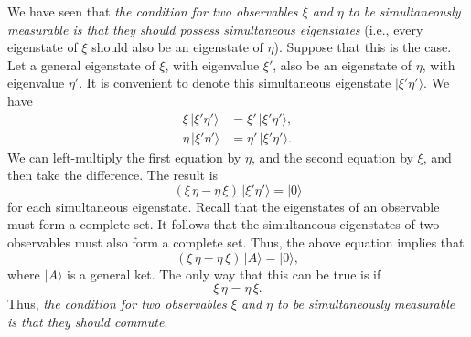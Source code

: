 We have seen that {\em the condition for two observables $\xi$ and $\eta$ to
be simultaneously measurable is that they should possess simultaneous
eigenstates} ({\rm i.e.}, every eigenstate of $\xi$ should also be an eigenstate
of $\eta$). Suppose that this is the case. Let a general eigenstate of
$\xi$,  with eigenvalue $\xi'$, also be an eigenstate of
$\eta$, with eigenvalue $\eta'$. It is convenient to denote this
simultaneous eigenstate $|\xi' \eta'\rangle$. We have
\begin{align}
\xi\,|\xi' \eta'\rangle &= \xi' \,|\xi' \eta'\rangle,\\[0.5ex]
\eta\,|\xi' \eta'\rangle &= \eta'\,|\xi' \eta'\rangle.
\end{align}
We can left-multiply the first equation by $\eta$, and the second equation
by $\xi$, and then take the difference. The result is
\begin{equation}
(\xi\,\eta -\eta\,\xi)\, |\xi' \eta'\rangle = |0\rangle
\end{equation}
for each simultaneous eigenstate. 
Recall that the eigenstates of an observable must form a complete set. It follows
that the simultaneous eigenstates of two observables must also form a complete set.
Thus, the above equation implies that
\begin{equation}
(\xi\,\eta -\eta\,\xi)\, |A\rangle = |0\rangle,
\end{equation}
where $|A\rangle$ is a general ket. The only way that this can
be true is if
\begin{equation}
\xi\,\eta =\eta\,\xi.
\end{equation}
Thus, {\em  the condition for two observables $\xi$ and $\eta$ to be simultaneously
measurable is that they should commute}. 

